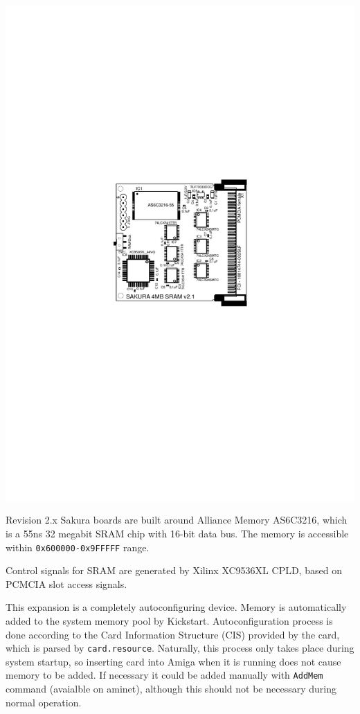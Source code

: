 \documentclass[10pt,a5paper]{article}
\begin{document}
\begin{center}
\includegraphics{board21layout.pdf}
\end{center}

Revision 2.x Sakura boards are built around Alliance Memory AS6C3216, which is a 55ns 32 megabit SRAM chip with 16-bit data bus. The memory is accessible within {\tt 0x600000-0x9FFFFF} range.

Control signals for SRAM are generated by Xilinx XC9536XL CPLD, based on PCMCIA slot access signals.

This expansion is a completely autoconfiguring device. Memory is automatically added to the system memory pool by Kickstart. Autoconfiguration process is done according to the Card Information Structure (CIS) provided by the card, which is parsed by {\tt card.resource}. Naturally, this process only takes place during system startup, so inserting card into Amiga when it is running does not cause memory to be added. If necessary it could be added manually with {\tt AddMem} command (avaialble on aminet), although this should not be necessary during normal operation.
\end{document}
